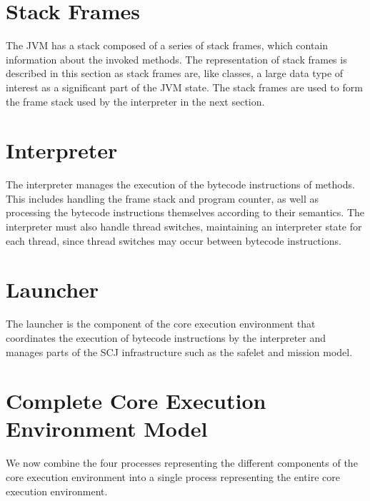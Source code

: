 

\section{Stack Frames}
\label{cee-stack-frames-section}

The JVM has a stack composed of a series of stack frames, which
contain information about the invoked methods.
The representation of stack frames is described in this section as
stack frames are, like classes, a large data type of interest as a
significant part of the JVM state.
The stack frames are used to form the frame stack used by the
interpreter in the next section.



\section{Interpreter}
\label{cee-interpreter-section}

The interpreter manages the execution of the bytecode instructions of
methods.
This includes handling the frame stack and program counter, as well as
processing the bytecode instructions themselves according to their
semantics.
The interpreter must also handle thread switches, maintaining an
interpreter state for each thread, since thread switches may occur
between bytecode instructions.



\section{Launcher}
\label{cee-launcher-section}

The launcher is the component of the core execution environment
that coordinates the execution of bytecode instructions by
the interpreter and manages parts of the SCJ infrastructure such as
the safelet and mission model.



\section{Complete Core Execution Environment Model}
\label{complete-cee-section}

We now combine the four \Circus{} processes representing the different
components of the core execution environment into a single \Circus{}
process representing the entire core execution environment.

